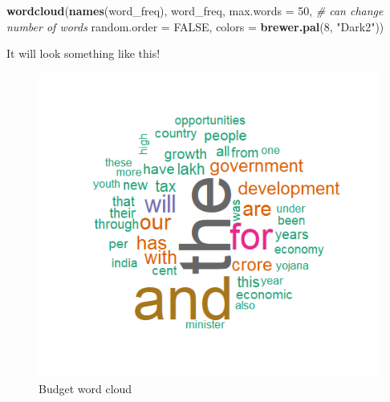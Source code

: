 \documentclass[
]{book}
\newenvironment{Shaded}{\begin{snugshade}}{\end{snugshade}}
\newcommand{\AttributeTok}[1]{\textcolor[rgb]{0.13,0.29,0.53}{#1}}
\newcommand{\CommentTok}[1]{\textcolor[rgb]{0.56,0.35,0.01}{\textit{#1}}}
\newcommand{\ConstantTok}[1]{\textcolor[rgb]{0.56,0.35,0.01}{#1}}
\newcommand{\DecValTok}[1]{\textcolor[rgb]{0.00,0.00,0.81}{#1}}
\newcommand{\FunctionTok}[1]{\textcolor[rgb]{0.13,0.29,0.53}{\textbf{#1}}}
\newcommand{\NormalTok}[1]{#1}
\newcommand{\StringTok}[1]{\textcolor[rgb]{0.31,0.60,0.02}{#1}}
\begin{document}
\begin{Shaded}
\begin{Highlighting}[]
\FunctionTok{wordcloud}\NormalTok{(}\FunctionTok{names}\NormalTok{(word\_freq), }
\NormalTok{          word\_freq, }\AttributeTok{max.words =} \DecValTok{50}\NormalTok{, }\CommentTok{\# can change number of words }
          \AttributeTok{random.order =} \ConstantTok{FALSE}\NormalTok{, }
          \AttributeTok{colors =} \FunctionTok{brewer.pal}\NormalTok{(}\DecValTok{8}\NormalTok{, }\StringTok{"Dark2"}\NormalTok{))}
\end{Highlighting}
\end{Shaded}

It will look something like this!

\begin{figure}

{\centering \includegraphics[width=1\linewidth]{pictures/budget_Speech} 

}

\caption{Budget word cloud}\label{fig:unnamed-chunk-64}
\end{figure}

  
\end{document}
